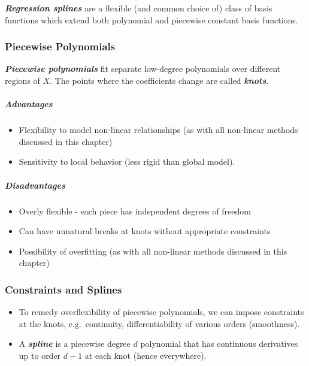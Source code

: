 \documentclass[11pt]{article}
\providecommand{\tightlist}{%
      \setlength{\itemsep}{0pt}\setlength{\parskip}{0pt}}
\begin{document}
    \textbf{\emph{Regression splines}} are a flexible (and common choice of)
class of basis functions which extend both polynomial and piecewise
constant basis functions.

    \hypertarget{piecewise-polynomials}{%
\subsubsection{Piecewise Polynomials}\label{piecewise-polynomials}}

    \textbf{\emph{Piecewise polynomials}} fit separate low-degree
polynomials over different regions of \(X\). The points where the
coefficients change are called \textbf{\emph{knots}}.

    \hypertarget{advantages}{%
\subparagraph{Advantages}\label{advantages}}

    \begin{itemize}
\tightlist
\item
  Flexibility to model non-linear relationships (as with all non-linear
  methods discussed in this chapter)
\item
  Sensitivity to local behavior (less rigid than global model).
\end{itemize}

    \hypertarget{disadvantages}{%
\subparagraph{Disadvantages}\label{disadvantages}}

    \begin{itemize}
\tightlist
\item
  Overly flexible - each piece has independent degrees of freedom
\item
  Can have unnatural breaks at knots without appropriate constraints
\item
  Possibility of overfitting (as with all non-linear methods discussed
  in this chapter)
\end{itemize}

    \hypertarget{constraints-and-splines}{%
\subsubsection{Constraints and Splines}\label{constraints-and-splines}}

    \begin{itemize}
\tightlist
\item
  To remedy overflexibility of piecewise polynomials, we can impose
  constraints at the knots, e.g.~continuity, differentiability of
  various orders (smoothness).
\item
  A \textbf{\emph{spline}} is a piecewise degree \(d\) polynomial that
  has continuous derivatives up to order \(d-1\) at each knot (hence
  everywhere).
\end{itemize}
\end{document}
